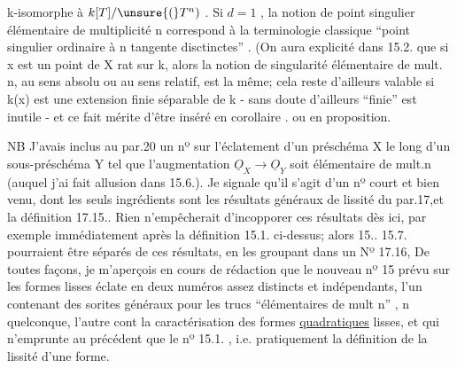 
k-isomorphe à $k[T]/\unsure{(}T^n)$ . Si $d=1$ , la notion de point singulier
 élémentaire de multiplicité n correspond à la terminologie
classique ``point singulier ordinaire à n tangente disctinctes'' .
\margin{(}(On aura  explicité dans 15.2. que si x est un point de X rat sur k, alors
la notion de singularité élémentaire de mult. n, au sens absolu ou au
sens relatif,  est la même; cela reste d'ailleurs valable si k(x)
est une extension finie séparable de k - sans doute d'ailleurs ``finie''
est inutile - et ce fait mérite d'être inséré en corollaire .
ou en proposition\hand{)}.

NB J'avais inclus au par.20 un nº sur l'éclatement d'un
préschéma X le long d'un sous-préschéma  Y tel que l'augmentation
$\underline{O}_X \longrightarrow \underline{O}_Y$ soit élémentaire de mult.n (auquel j'ai fait allusion dans
15.6.). Je signale qu'il s'agit d'un nº court et bien venu, dont les
seuls ingrédients sont les résultats généraux de lissité du par.17,et
la définition  17.15..  Rien n'empêcherait d'incopporer ces résultats
dès ici,  par exemple immédiatement après la définition
15.1. ci-dessus; alors  15..  15.7. pourraient être séparés
de ces  résultats, en les groupant dans un Nº 17.16, 
 De toutes façons, je m'aperçois en cours de rédaction que le
\margin{(}nouveau nº 15 prévu sur les formes lisses éclate en  deux numéros assez
distincts et indépendants, l'un contenant des sorites généraux pour
les trucs ``élémentaires de mult n'' , n quelconque, l'autre  cont la
caractérisation des formes \uline{quadratiques} lisses, et qui n'emprunte au
précédent que le nº 15.1. , i.e. pratiquement la définition de la lissité
d'une forme.

